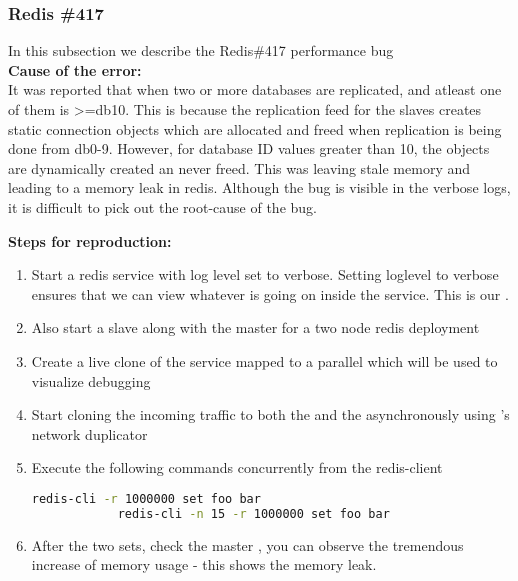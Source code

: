 \subsubsection{Redis \#417}

In this subsection we describe the Redis\#417 performance bug \\

\noindent \textbf{Cause of the error:} \\

It was reported that when two or more databases are replicated, and atleast one of them is \textgreater=db10. This is because the replication feed for the slaves creates static connection objects which are allocated and freed when replication is being done from db0-9. However, for database ID values greater than 10, the objects are dynamically created an never freed.
This was leaving stale memory and leading to a memory leak in redis.
Although the bug is visible in the verbose logs, it is difficult to pick out the root-cause of the bug.

\noindent \textbf{Steps for reproduction:} \\

\begin{adjustwidth}{0.5cm}{}
	\begin{enumerate}
		\item Start a redis service with log level set to verbose. Setting loglevel to verbose ensures that we can view whatever is going on inside the service. This is our \productioncontainer.
		\item Also start a slave along with the master for a two node redis deployment
		\item Create a live clone of the service mapped to a parallel \debugcontainer which will be used to visualize debugging
		\item Start cloning the incoming traffic to both the \productioncontainer and the \debugcontainer asynchronously using \parikshan's network duplicator
		
		\item Execute the following commands concurrently from the redis-client
		
		\begin{lstlisting}[language=sh]
			redis-cli -r 1000000 set foo bar
			redis-cli -n 15 -r 1000000 set foo bar
		\end{lstlisting}
		
		\item After the two sets, check the master \debugcontainer, you can observe the tremendous increase of memory usage - this shows the memory leak.
		
	\end{enumerate}
\end{adjustwidth}	


